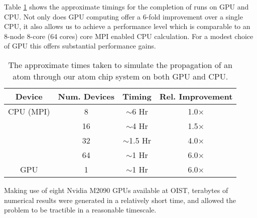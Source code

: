 Table \ref{tbl:timing} shows the approximate timings for the completion of runs on GPU and CPU. Not only does GPU computing offer a 6-fold improvement over a single CPU, it also allows us to achieve a performance level which is comparable to an 8-node 8-core (64 cores) core MPI enabled CPU calculation. For a modest choice of GPU this offers substantial performance gains.

\begin{table}[tb]
  \begin{center}
    \begin{tabular}{|c||c|c|c|}
      \hline
      Device & Num. Devices & Timing  & Rel. Improvement \\ \hline
      CPU (MPI) & 8 & $\sim$6 Hr & 1.0$\times$ \\
      & 16 & $\sim$4 Hr & 1.5$\times$ \\
      & 32 & $\sim$1.5 Hr & 4.0$\times$ \\
      & 64 & $\sim$1 Hr & 6.0$\times$ \\ \hline
      GPU & 1 & $\sim$1 Hr & 6.0$\times$ \\ \hline
    \end{tabular}
  \end{center}
   \caption{The approximate times taken to simulate the propagation of an atom through our atom chip system on both GPU and CPU.}
   \label{tbl:timing}
\end{table}

Making use of eight Nvidia M2090 GPUs available at OIST, terabytes of numerical results were generated in a relatively short time, and allowed the problem to be tractible in a reasonable timescale.

